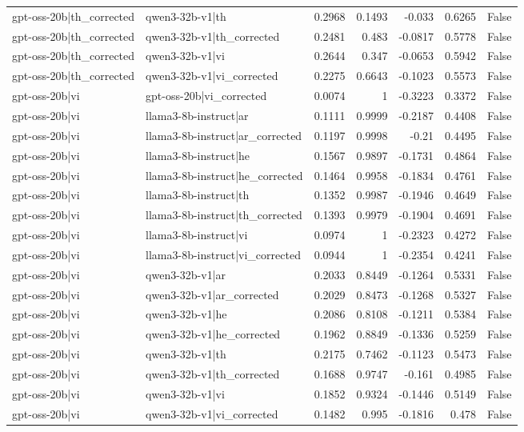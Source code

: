 \begin{table}
\begin{tabular}{l l r r r r l}
gpt-oss-20b|th_corrected & qwen3-32b-v1|th & 0.2968 & 0.1493 & -0.033 & 0.6265 & False \\
gpt-oss-20b|th_corrected & qwen3-32b-v1|th_corrected & 0.2481 & 0.483 & -0.0817 & 0.5778 & False \\
gpt-oss-20b|th_corrected & qwen3-32b-v1|vi & 0.2644 & 0.347 & -0.0653 & 0.5942 & False \\
gpt-oss-20b|th_corrected & qwen3-32b-v1|vi_corrected & 0.2275 & 0.6643 & -0.1023 & 0.5573 & False \\
gpt-oss-20b|vi & gpt-oss-20b|vi_corrected & 0.0074 & 1 & -0.3223 & 0.3372 & False \\
gpt-oss-20b|vi & llama3-8b-instruct|ar & 0.1111 & 0.9999 & -0.2187 & 0.4408 & False \\
gpt-oss-20b|vi & llama3-8b-instruct|ar_corrected & 0.1197 & 0.9998 & -0.21 & 0.4495 & False \\
gpt-oss-20b|vi & llama3-8b-instruct|he & 0.1567 & 0.9897 & -0.1731 & 0.4864 & False \\
gpt-oss-20b|vi & llama3-8b-instruct|he_corrected & 0.1464 & 0.9958 & -0.1834 & 0.4761 & False \\
gpt-oss-20b|vi & llama3-8b-instruct|th & 0.1352 & 0.9987 & -0.1946 & 0.4649 & False \\
gpt-oss-20b|vi & llama3-8b-instruct|th_corrected & 0.1393 & 0.9979 & -0.1904 & 0.4691 & False \\
gpt-oss-20b|vi & llama3-8b-instruct|vi & 0.0974 & 1 & -0.2323 & 0.4272 & False \\
gpt-oss-20b|vi & llama3-8b-instruct|vi_corrected & 0.0944 & 1 & -0.2354 & 0.4241 & False \\
gpt-oss-20b|vi & qwen3-32b-v1|ar & 0.2033 & 0.8449 & -0.1264 & 0.5331 & False \\
gpt-oss-20b|vi & qwen3-32b-v1|ar_corrected & 0.2029 & 0.8473 & -0.1268 & 0.5327 & False \\
gpt-oss-20b|vi & qwen3-32b-v1|he & 0.2086 & 0.8108 & -0.1211 & 0.5384 & False \\
gpt-oss-20b|vi & qwen3-32b-v1|he_corrected & 0.1962 & 0.8849 & -0.1336 & 0.5259 & False \\
gpt-oss-20b|vi & qwen3-32b-v1|th & 0.2175 & 0.7462 & -0.1123 & 0.5473 & False \\
gpt-oss-20b|vi & qwen3-32b-v1|th_corrected & 0.1688 & 0.9747 & -0.161 & 0.4985 & False \\
gpt-oss-20b|vi & qwen3-32b-v1|vi & 0.1852 & 0.9324 & -0.1446 & 0.5149 & False \\
gpt-oss-20b|vi & qwen3-32b-v1|vi_corrected & 0.1482 & 0.995 & -0.1816 & 0.478 & False \\

\end{tabular}
\end{table}
